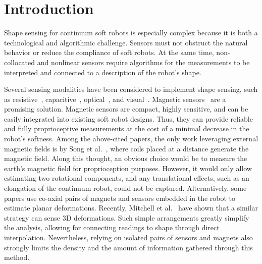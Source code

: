 \section{Introduction}\label{sec:promasens:introduction}
%
%
%
Shape sensing for continuum soft robots is especially complex because it is both a technological and algorithmic challenge. Sensors must not obstruct the natural behavior or reduce the compliance of soft robots. At the same time, non-collocated and nonlinear sensors require algorithms for the measurements to be interpreted and connected to a description of the robot's shape.

Several sensing modalities have been considered to implement shape sensing, such as resistive~\cite{shih2019design, kramer2011soft}, capacitive~\cite{scimeca2019model, shintake2018ultrastretchable}, optical~\cite{li2021scaling}, and visual~\cite{rosi2022sensing}. Magnetic sensors~\cite{song2015electromagnetic, ozel2015precise, luo2017toward, guo2019continuum, mitchell2021fast} are a promising solution. Magnetic sensors are compact, highly sensitive, and can be easily integrated into existing soft robot designs. Thus, they can provide reliable and fully proprioceptive measurements at the cost of a minimal decrease in the robot's softness. Among the above-cited papers, the only work leveraging external magnetic fields is by Song et al.~\cite{song2015electromagnetic}, where coils placed at a distance generate the magnetic field.
Along this thought, an obvious choice would be to measure the earth's magnetic field for proprioception purposes. However, it would only allow estimating two rotational components, and any translational effects, such as an elongation of the continuum robot, could not be captured.
Alternatively, some papers \cite{ozel2015precise,luo2017toward,guo2019continuum} use co-axial pairs of magnets and sensors embedded in the robot to estimate planar deformations. Recently, Mitchell et al.~\cite{mitchell2021fast} have shown that a similar strategy can sense 3D deformations. Such simple arrangements greatly simplify the analysis, allowing for connecting readings to shape through direct interpolation. Nevertheless, relying on isolated pairs of sensors and magnets also strongly limits the density and the amount of information gathered through this method.

